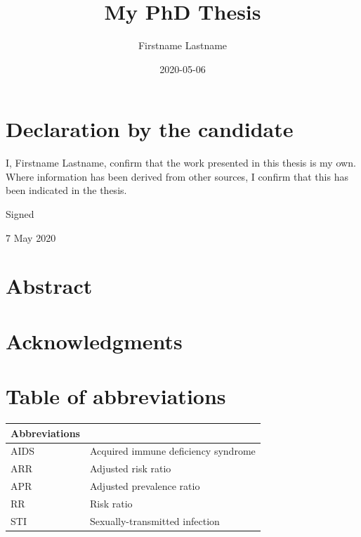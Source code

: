 \documentclass[12pt,]{book}
\title{My PhD Thesis}
\subtitle{Firstname Lastname}
\author{Submitted in accordance with the requirements \and for the degree of Doctor of Philosophy \and  \and London School of Hygiene and Tropical Medicine}
\date{2020-05-06}
\begin{document}
\maketitle

\hypertarget{declaration-by-the-candidate}{%
\chapter*{Declaration by the candidate}\label{declaration-by-the-candidate}}

I, Firstname Lastname, confirm that the work presented in this thesis is my own. Where information has been derived from other sources, I confirm that this has been indicated in the thesis.

Signed

\vspace{1in}

7 May 2020

\pagebreak

\hypertarget{abstract}{%
\chapter*{Abstract}\label{abstract}}

\blindtext

\pagebreak

\hypertarget{acknowledgments}{%
\chapter*{Acknowledgments}\label{acknowledgments}}

\Blindtext

\pagebreak 
\onehalfspacing

\hypertarget{table-of-abbreviations}{%
\chapter*{Table of abbreviations}\label{table-of-abbreviations}}

\begin{longtable}[]{@{}ll@{}}
\toprule
\textbf{Abbreviations} &\tabularnewline
\midrule
\endhead
AIDS & Acquired immune deficiency syndrome\tabularnewline
ARR & Adjusted risk ratio\tabularnewline
APR & Adjusted prevalence ratio\tabularnewline
RR & Risk ratio\tabularnewline
STI & Sexually-transmitted infection\tabularnewline
\bottomrule
\end{longtable}
\end{document}
